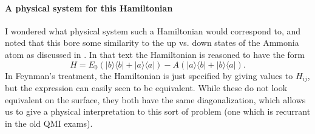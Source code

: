 {\paragraph{A physical system for this Hamiltonian}

I wondered what physical system such a Hamiltonian would correspond to, and noted that this bore some similarity to the up vs. down states of the Ammonia atom as discussed in \citep{feynman1963flp}.  In that text the Hamiltonian is reasoned to have the form
%
\begin{equation}\label{eqn:qmIexamPractice2008Dec:2:180}
H = E_0 ( {\lvert {b} \rangle}{\langle {b} \rvert}+ {\lvert {a} \rangle}{\langle {a} \rvert})- A( {\lvert {a} \rangle}{\langle {b} \rvert}+ {\lvert {b} \rangle}{\langle {a} \rvert}).
\end{equation}
%
In Feynman's treatment, the Hamiltonian is just specified by giving values to \(H_{ij}\), but the expression can easily seen to be equivalent.  While these do not look equivalent on the surface, they both have the same diagonalization, which allows us to give a physical interpretation to this sort of problem (one which is recurrant in the old QMI exams).
} %
